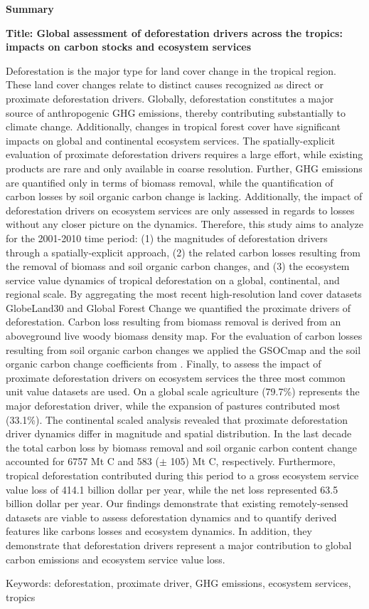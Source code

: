 \thispagestyle{empty}

\begin{center}
	\textbf{Summary}
\end{center}
	\textbf{Title: Global assessment of deforestation drivers across the tropics: impacts on carbon stocks and ecosystem services}

	Deforestation is the major type for land cover change in the tropical region. These land cover changes relate to distinct causes recognized as direct or proximate deforestation drivers. Globally, deforestation constitutes a major source of anthropogenic \ac{GHG} emissions, thereby contributing substantially to climate change. Additionally, changes in tropical forest cover have significant impacts on global and continental ecosystem services. The spatially-explicit evaluation of proximate deforestation drivers requires a large effort, while existing products are rare and only available in coarse resolution. Further, \ac{GHG} emissions are quantified only in terms of biomass removal, while the quantification of carbon losses by soil organic carbon change is lacking. Additionally, the impact of deforestation drivers on ecosystem services are only assessed in regards to losses without any closer picture on the dynamics. Therefore, this study aims to analyze for the 2001-2010 time period: (1) the magnitudes of deforestation drivers through a spatially-explicit approach, (2) the related carbon losses resulting from the removal of biomass and soil organic carbon changes, and (3) the ecosystem service value dynamics of tropical deforestation on a global, continental, and regional scale. By aggregating the most recent high-resolution land cover datasets GlobeLand30 and Global Forest Change we quantified the proximate drivers of deforestation. Carbon loss resulting from biomass removal is derived from an aboveground live woody biomass density map.  For the evaluation of carbon losses resulting from soil organic carbon changes we applied the GSOCmap and the soil organic carbon change coefficients from \citet{Don2010}. Finally, to assess the impact of proximate deforestation drivers on ecosystem services the three most common unit value datasets are used. On a global scale agriculture (79.7\%) represents the major deforestation driver, while the expansion of pastures contributed most (33.1\%). The continental scaled analysis revealed that proximate deforestation driver dynamics differ in magnitude and spatial distribution. In the last decade the total carbon loss by biomass removal and soil organic carbon content change accounted for 6757 Mt C and 583 ($\pm$ 105) Mt C, respectively. Furthermore, tropical deforestation contributed during this period to a gross ecosystem service value loss of 414.1 billion dollar per year, while the net loss represented 63.5 billion dollar per year.  Our findings demonstrate that existing remotely-sensed datasets are viable to assess deforestation dynamics and to quantify derived features like carbons losses and ecosystem dynamics. In addition, they demonstrate that deforestation drivers represent a major contribution to global carbon emissions and ecosystem service value loss.

	Keywords: deforestation, proximate driver, GHG emissions, ecosystem services, tropics
